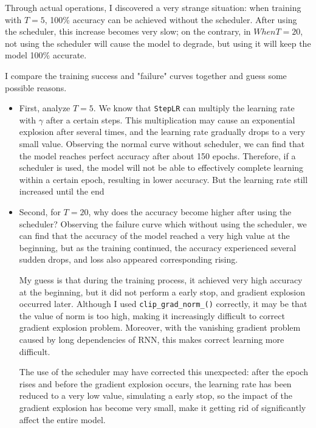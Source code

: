 \documentclass{article}
\begin{document}
Through actual operations, I discovered a very strange situation: when training with $T=5$, 100\% accuracy can be achieved without the scheduler. After using the scheduler, this increase becomes very slow; on the contrary, in $ When T=20$, not using the scheduler will cause the model to degrade, but using it will keep the model 100\% accurate.

I compare the training success and "failure" curves together and guess some possible reasons.

\begin{itemize}
    \item First, analyze $T=5$. We know that \texttt{StepLR} can multiply the learning rate with $\gamma$ after a certain steps. This multiplication may cause an exponential explosion after several times, and the learning rate gradually drops to a very small value. Observing the normal curve without scheduler, we can find that the model reaches perfect accuracy after about 150 epochs. Therefore, if a scheduler is used, the model will not be able to effectively complete learning within a certain epoch, resulting in lower accuracy. But the learning rate still increased until the end
    
    \item {Second, for $T=20$, why does the accuracy become higher after using the scheduler? Observing the failure curve which without using the scheduler, we can find that the accuracy of the model reached a very high value at the beginning, but as the training continued, the accuracy experienced several sudden drops, and loss also appeared corresponding rising.
    
    My guess is that during the training process, it achieved very high accuracy at the beginning, but it did not perform a early stop, and gradient explosion occurred later. Although I used \texttt{clip\_grad\_norm\_()} correctly, it may be that the value of norm is too high, making it increasingly difficult to correct gradient explosion problem. Moreover, with the vanishing gradient problem caused by long dependencies of RNN, this makes correct learning more difficult.
    
    The use of the scheduler may have corrected this unexpected: after the epoch rises and before the gradient explosion occurs, the learning rate has been reduced to a very low value, simulating a early stop, so the impact of the gradient explosion has become very small, make it getting rid of significantly affect the entire model.
    }
\end{itemize}
\end{document}
